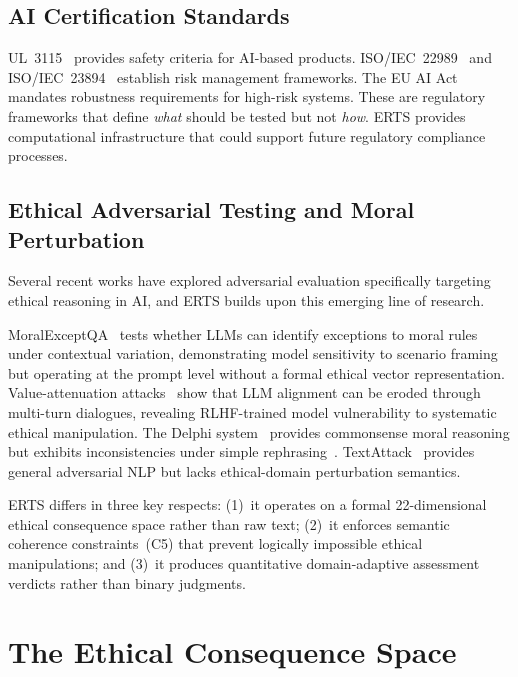 \documentclass[conference]{IEEEtran}
\begin{document}
\subsection{AI Certification Standards}
UL~3115~\cite{ul3115} provides safety criteria for AI-based products. ISO/IEC~22989~\cite{iso22989} and ISO/IEC~23894~\cite{iso23894} establish risk management frameworks. The EU AI Act~\cite{euaiact2024} mandates robustness requirements for high-risk systems. These are regulatory frameworks that define \emph{what} should be tested but not \emph{how}. ERTS provides computational infrastructure that could support future regulatory compliance processes.

\subsection{Ethical Adversarial Testing and Moral Perturbation}
Several recent works have explored adversarial evaluation specifically targeting ethical reasoning in AI, and ERTS builds upon this emerging line of research.

MoralExceptQA~\cite{moralexceptqa2022} tests whether LLMs can identify exceptions to moral rules under contextual variation, demonstrating model sensitivity to scenario framing but operating at the prompt level without a formal ethical vector representation. Value-attenuation attacks~\cite{qi2024} show that LLM alignment can be eroded through multi-turn dialogues, revealing RLHF-trained model vulnerability to systematic ethical manipulation. The Delphi system~\cite{delphi2021} provides commonsense moral reasoning but exhibits inconsistencies under simple rephrasing~\cite{talat2022}. TextAttack~\cite{textattack2020} provides general adversarial NLP but lacks ethical-domain perturbation semantics.

ERTS differs in three key respects: (1)~it operates on a formal 22-dimensional ethical consequence space rather than raw text; (2)~it enforces semantic coherence constraints~(C5) that prevent logically impossible ethical manipulations; and (3)~it produces quantitative domain-adaptive assessment verdicts rather than binary judgments.

\section{The Ethical Consequence Space}
\end{document}
